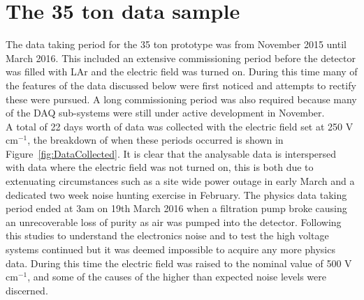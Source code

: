 \chapter{The 35 ton data sample}  %
  
\graphicspath{{35tonData/Figs/PDF/}{35tonData/Figs/Raster/}{35tonData/Figs/Vector/}}

The data taking period for the 35 ton prototype was from November 2015 until March 2016. This included an extensive commissioning period before the detector was filled with LAr and the electric field was turned on. During this time many of the features of the data discussed below were first noticed and attempts to rectify these were pursued. A long commissioning period was also required because many of the DAQ sub-systems were still under active development in November.\\

A total of 22 days worth of data was collected with the electric field set at 250 V cm$^{-1}$, the breakdown of when these periods occurred is shown in Figure~\ref{fig:DataCollected}. It is clear that the analysable data is interspersed with data where the electric field was not turned on, this is both due to extenuating circumstances such as a site wide power outage in early March and a dedicated two week noise hunting exercise in February. The physics data taking period ended at 3am on 19th March 2016 when a filtration pump broke causing an unrecoverable loss of purity as air was pumped into the detector. Following this studies to understand the electronics noise and to test the high voltage systems continued but it was deemed impossible to acquire any more physics data. During this time the electric field was raised to the nominal value of 500  V cm$^{-1}$, and some of the causes of the higher than expected noise levels were discerned. \\

